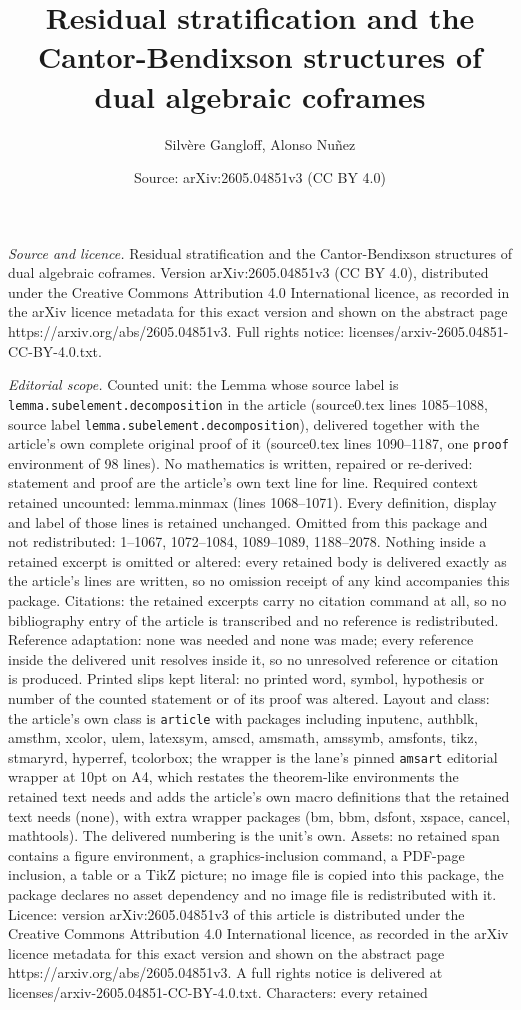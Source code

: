 \documentclass[10pt,a4paper]{amsart}
\title[Residual stratification and the Cantor-Bendixson structures ]{Residual stratification and the Cantor-Bendixson structures of dual algebraic coframes}
\author{Silv\`ere Gangloff, Alonso Nu\~nez}
\date{Source: arXiv:2605.04851v3 (CC BY 4.0)}
\begin{document}
\maketitle

\noindent\emph{Source and licence.} Residual stratification and the Cantor-Bendixson structures of dual algebraic coframes. Version arXiv:2605.04851v3 (CC BY 4.0), distributed under the Creative Commons Attribution 4.0 International licence, as recorded in the arXiv licence metadata for this exact version and shown on the abstract page https://arxiv.org/abs/2605.04851v3. Full rights notice: licenses/arxiv-2605.04851-CC-BY-4.0.txt.\par\smallskip

\noindent\textit{Editorial scope.} Counted unit: the Lemma whose source label is \texttt{lemma.subelement.decomposition} in the article (source0.tex lines 1085--1088, source label \texttt{lemma.subelement.decomposition}), delivered together with the article's own complete original proof of it (source0.tex lines 1090--1187, one \texttt{proof} environment of 98 lines). No mathematics is written, repaired or re-derived: statement and proof are the article's own text line for line. Required context retained uncounted: lemma.minmax (lines 1068--1071). Every definition, display and label of those lines is retained unchanged. Omitted from this package and not redistributed: 1--1067, 1072--1084, 1089--1089, 1188--2078. Nothing inside a retained excerpt is omitted or altered: every retained body is delivered exactly as the article's lines are written, so no omission receipt of any kind accompanies this package. Citations: the retained excerpts carry no citation command at all, so no bibliography entry of the article is transcribed and no reference is redistributed. Reference adaptation: none was needed and none was made; every reference inside the delivered unit resolves inside it, so no unresolved reference or citation is produced. Printed slips kept literal: no printed word, symbol, hypothesis or number of the counted statement or of its proof was altered. Layout and class: the article's own class is \texttt{article} with packages including inputenc, authblk, amsthm, xcolor, ulem, latexsym, amscd, amsmath, amssymb, amsfonts, tikz, stmaryrd, hyperref, tcolorbox; the wrapper is the lane's pinned \texttt{amsart} editorial wrapper at 10pt on A4, which restates the theorem-like environments the retained text needs and adds the article's own macro definitions that the retained text needs (none), with extra wrapper packages (bm, bbm, dsfont, xspace, cancel, mathtools). The delivered numbering is the unit's own. Assets: no retained span contains a figure environment, a graphics-inclusion command, a PDF-page inclusion, a table or a TikZ picture; no image file is copied into this package, the package declares no asset dependency and no image file is redistributed with it. Licence: version arXiv:2605.04851v3 of this article is distributed under the Creative Commons Attribution 4.0 International licence, as recorded in the arXiv licence metadata for this exact version and shown on the abstract page https://arxiv.org/abs/2605.04851v3. A full rights notice is delivered at licenses/arxiv-2605.04851-CC-BY-4.0.txt. Characters: every retained 
\end{document}
